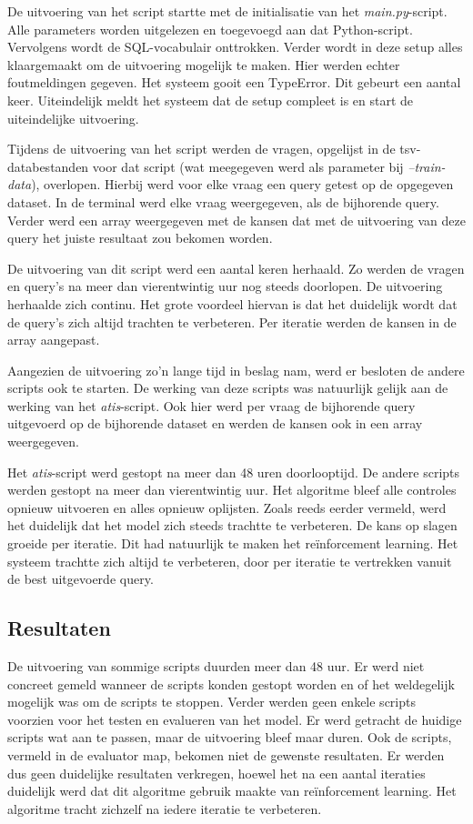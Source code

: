 De uitvoering van het script startte met de initialisatie van het \textit{main.py}-script. Alle parameters worden uitgelezen en toegevoegd aan dat Python-script. Vervolgens wordt de SQL-vocabulair onttrokken. Verder wordt in deze setup alles klaargemaakt om de uitvoering mogelijk te maken. Hier werden echter foutmeldingen gegeven. Het systeem gooit een TypeError. Dit gebeurt een aantal keer. Uiteindelijk meldt het systeem dat de setup compleet is en start de uiteindelijke uitvoering.

Tijdens de uitvoering van het script werden de vragen, opgelijst in de tsv-databestanden voor dat script (wat meegegeven werd als parameter bij \textit{--train-data}), overlopen. Hierbij werd voor elke vraag een query getest op de opgegeven dataset. In de terminal werd elke vraag weergegeven, als de bijhorende query. Verder werd een array weergegeven met de kansen dat met de uitvoering van deze query het juiste resultaat zou bekomen worden.

De uitvoering van dit script werd een aantal keren herhaald. Zo werden de vragen en query's na meer dan vierentwintig uur nog steeds doorlopen. De uitvoering herhaalde zich continu. Het grote voordeel hiervan is dat het duidelijk wordt dat de query's zich altijd trachten te verbeteren. Per iteratie werden de kansen in de array aangepast.

Aangezien de uitvoering zo'n lange tijd in beslag nam, werd er besloten de andere scripts ook te starten. De werking van deze scripts was natuurlijk gelijk aan de werking van het \textit{atis}-script. Ook hier werd per vraag de bijhorende query uitgevoerd op de bijhorende dataset en werden de kansen ook in een array weergegeven.

Het \textit{atis}-script werd gestopt na meer dan 48 uren doorlooptijd. De andere scripts werden gestopt na meer dan vierentwintig uur. Het algoritme bleef alle controles opnieuw uitvoeren en alles opnieuw oplijsten. Zoals reeds eerder vermeld, werd het duidelijk dat het model zich steeds trachtte te verbeteren. De kans op slagen groeide per iteratie. Dit had natuurlijk te maken het reïnforcement learning. Het systeem trachtte zich altijd te verbeteren, door per iteratie te vertrekken vanuit de best uitgevoerde query. 

\subsection{Resultaten}

De uitvoering van sommige scripts duurden meer dan 48 uur. Er werd niet concreet gemeld wanneer de scripts konden gestopt worden en of het weldegelijk mogelijk was om de scripts te stoppen. Verder werden geen enkele scripts voorzien voor het testen en evalueren van het model. Er werd getracht de huidige scripts wat aan te passen, maar de uitvoering bleef maar duren. Ook de scripts, vermeld in de evaluator map, bekomen niet de gewenste resultaten. Er werden dus geen duidelijke resultaten verkregen, hoewel het na een aantal iteraties duidelijk werd dat dit algoritme gebruik maakte van reïnforcement learning. Het algoritme tracht zichzelf na iedere iteratie te verbeteren.

